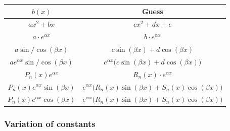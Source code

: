 \documentclass[8pt]{extarticle}
\begin{document}
\begin{multicols*}{3}
  \begin{center}
    \begin{tabular}{|c|c|}
      \hline
      $b(x)$                              & Guess                                                                  \\ \hline
      $ax^2 + bx$              & $cx^2 + dx + e$                                                 \\ \hline
      $a \cdot e^{\alpha x}$              & $b \cdot e^{\alpha x}$                                                 \\ \hline
      $a \sin / \cos(\beta x)$                   & $c \sin(\beta x) + d \cos(\beta x)$                                    \\ \hline
      $a e^{\alpha x} \sin / \cos(\beta x)$      & $e^{\alpha x} \Big( c \sin(\beta x) + d \cos(\beta x) \Big)$           \\ \hline
      $P_n(x) e^{\alpha x}$               & $R_n(x) \cdot e^{\alpha x}$                                            \\ \hline
      $P_n(x) e^{\alpha x} \sin(\beta x)$ & $e^{\alpha x} \Big( R_n(x) \sin(\beta x) + S_n(x) \cos(\beta x) \Big)$ \\ \hline
      $P_n(x) e^{\alpha x} \cos(\beta x)$ & $e^{\alpha x} \Big( R_n(x) \sin(\beta x) + S_n(x) \cos(\beta x) \Big)$ \\ \hline
    \end{tabular}
  \end{center}

    \subsubsection {Variation of constants}
  

\end{multicols*}
\end{document}
